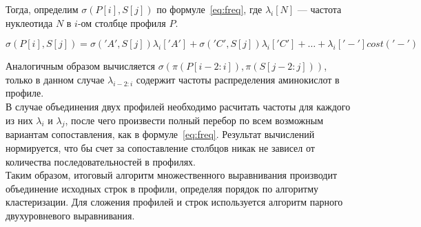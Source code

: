 Тогда, определим $\sigma(P[i], S[j])$ по формуле~\ref{eq:freq}, где $\lambda_i[N]$ --- частота нуклеотида $N$ в $i$-ом столбце профиля $P$.

\begin{equation}\label{eq:freq}
\sigma(P[i], S[j])=\sigma('A', S[j])\lambda_i['A']+\sigma('C', S[j])\lambda_i['C']+ \dots +\lambda_i['-']cost('-')
\end{equation}

Аналогичным образом вычисляется $\sigma(\pi(P[i-2:i]), \pi(S[j-2:j]))$, только в данном случае $\lambda_{i-2:i}$ содержит частоты распределения аминокислот в профиле.\\
\indent В случае объединения двух профилей необходимо расчитать частоты для каждого из них $\lambda_i$ и $\lambda_j$, после чего произвести полный перебор по всем возможным вариантам сопоставления, как в формуле~\ref{eq:freq}. Результат вычислений нормируется, что бы счет за сопоставление столбцов никак не зависел от количества последовательностей в профилях.\\
\indent Таким образом, итоговый алгоритм множественного выравнивания производит объединение исходных строк в профили, определяя порядок по алгоритму кластеризации. Для сложения профилей и строк используется алгоритм парного двухуровневого выравнивания.